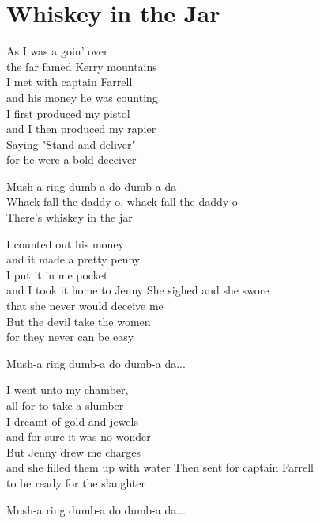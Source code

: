 \section{Whiskey in the Jar}

As I was a goin' over\\
the far famed Kerry mountains\\
I met with captain Farrell\\
and his money he was counting\\
I first produced my pistol\\
and I then produced my rapier\\
Saying "Stand and deliver"\\
for he were a bold deceiver

Mush-a ring dumb-a do dumb-a da\\
Whack fall the daddy-o, whack fall the daddy-o\\
There's whiskey in the jar

I counted out his money\\
and it made a pretty penny\\
I put it in me pocket\\
and I took it home to Jenny
She sighed and she swore\\
that she never would deceive me\\
But the devil take the women\\
for they never can be easy

Mush-a ring dumb-a do dumb-a da...

I went unto my chamber,\\
all for to take a slumber\\
I dreamt of gold and jewels\\
and for sure it was no wonder\\
But Jenny drew me charges\\
and she filled them up with water
Then sent for captain Farrell\\
to be ready for the slaughter

Mush-a ring dumb-a do dumb-a da...